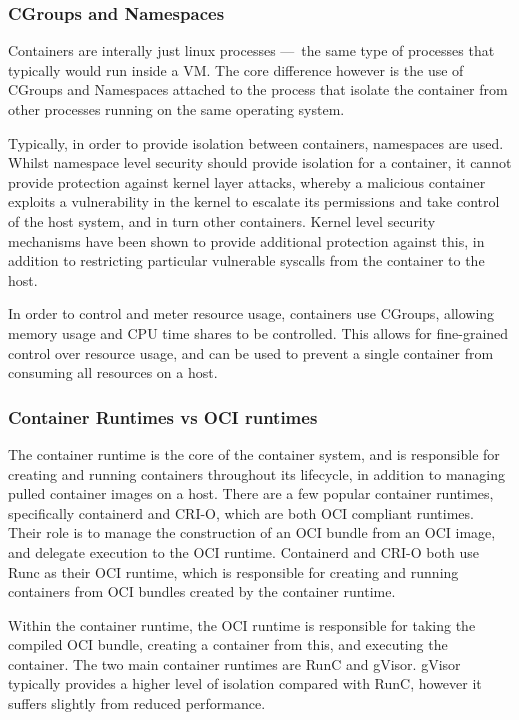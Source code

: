 \subsubsection{CGroups and Namespaces}
Containers are interally just linux processes — the same type of processes that typically would run inside a VM. The core difference however is the use of CGroups and Namespaces\cite{rosenramiNamespacesCgroupsBasis2016} attached to the process that isolate the container from other processes running on the same operating system.

Typically, in order to provide isolation between containers, namespaces are used\cite{NamespacesLinuxManual}. Whilst namespace level security should provide isolation for a container, it cannot provide protection against kernel layer attacks, whereby a malicious container exploits a vulnerability in the kernel to escalate its permissions and take control of the host system\cite{CVECVE202014386}, and in turn other containers\cite{linMeasurementStudyLinux2018}. Kernel level security mechanisms have been shown to provide additional protection against this\cite{sunSecurityNamespaceMaking2018}, in addition to restricting particular vulnerable syscalls from the container to the host\cite{GVisor}.

In order to control and meter resource usage, containers use CGroups, allowing memory usage and CPU time shares to be controlled\cite{CgroupsLinuxManual}. This allows for fine-grained control over resource usage, and can be used to prevent a single container from consuming all resources on a host\cite{ContainerSecurityFundamentals}.

\subsubsection{Container Runtimes vs OCI runtimes}
The container runtime is the core of the container system, and is responsible for creating and running containers throughout its lifecycle, in addition to managing pulled container images on a host\cite{espePerformanceEvaluationContainer2020}. There are a few popular container runtimes, specifically containerd and CRI-O, which are both OCI compliant runtimes. Their role is to manage the construction of an OCI bundle from an OCI image, and delegate execution to the OCI runtime. Containerd and CRI-O both use Runc as their OCI runtime, which is responsible for creating and running containers from OCI bundles created by the container runtime.

Within the container runtime, the OCI runtime is responsible for taking the compiled OCI bundle, creating a container from this, and executing the container. The two main container runtimes are RunC\cite{OpencontainersRunc2024} and gVisor\cite{GVisor}. gVisor typically provides a higher level of isolation compared with RunC, however it suffers slightly from reduced performance\cite{espePerformanceEvaluationContainer2020}.

